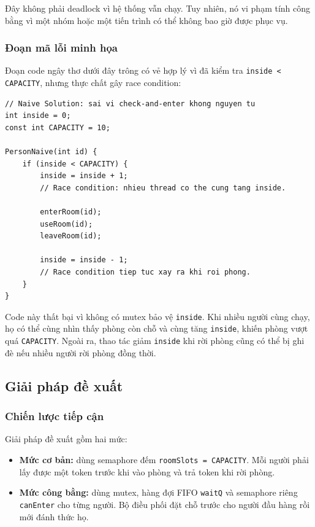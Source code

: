 Đây không phải deadlock vì hệ thống vẫn chạy. Tuy nhiên, nó vi phạm tính
công bằng vì một nhóm hoặc một tiến trình có thể không bao giờ được phục
vụ.

\subsubsection*{Đoạn mã lỗi minh họa}

Đoạn code ngây thơ dưới đây trông có vẻ hợp lý vì đã kiểm tra
\texttt{inside < CAPACITY}, nhưng thực chất gây race condition:

\begin{lstlisting}
// Naive Solution: sai vi check-and-enter khong nguyen tu
int inside = 0;
const int CAPACITY = 10;

PersonNaive(int id) {
    if (inside < CAPACITY) {
        inside = inside + 1;
        // Race condition: nhieu thread co the cung tang inside.

        enterRoom(id);
        useRoom(id);
        leaveRoom(id);

        inside = inside - 1;
        // Race condition tiep tuc xay ra khi roi phong.
    }
}
\end{lstlisting}

Code này thất bại vì không có mutex bảo vệ \texttt{inside}. Khi nhiều
người cùng chạy, họ có thể cùng nhìn thấy phòng còn chỗ và cùng tăng
\texttt{inside}, khiến phòng vượt quá \texttt{CAPACITY}. Ngoài ra, thao
tác giảm \texttt{inside} khi rời phòng cũng có thể bị ghi đè nếu nhiều
người rời phòng đồng thời.


\subsection{Giải pháp đề xuất}

\subsubsection*{Chiến lược tiếp cận}

Giải pháp đề xuất gồm hai mức:

\begin{itemize}
    \item \textbf{Mức cơ bản:} dùng semaphore đếm
    \texttt{roomSlots = CAPACITY}. Mỗi người phải lấy được một token trước
    khi vào phòng và trả token khi rời phòng.
    \item \textbf{Mức công bằng:} dùng mutex, hàng đợi FIFO
    \texttt{waitQ} và semaphore riêng \texttt{canEnter} cho từng người.
    Bộ điều phối đặt chỗ trước cho người đầu hàng rồi mới đánh thức họ.
\end{itemize}

